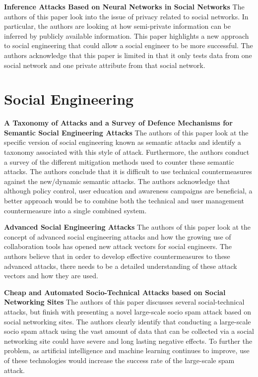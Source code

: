 \documentclass[conference]{IEEEtran}
\begin{document}
\textbf {Inference Attacks Based on Neural Networks in Social Networks}
The authors of this paper look into the issue of privacy related to social networks. In particular, the authors are looking at how semi-private information can be inferred by publicly available information.  This paper highlights a new approach to social engineering that could allow a social engineer to be more successful. The authors acknowledge that this paper is limited in that it only tests data from one social network and one private attribute from that social network. 

\section{Social Engineering}

\textbf {A Taxonomy of Attacks and a Survey of Defence Mechanisms for Semantic Social Engineering Attacks}
The authors of this paper look at the specific version of social engineering known as semantic attacks and identify a taxonomy associated with this style of attack. Furthermore, the authors conduct a survey of the different mitigation methods used to counter these semantic attacks.  The authors conclude that it is difficult to use technical countermeasures against the new/dynamic semantic attacks. The authors acknowledge that although policy control, user education and awareness campaigns are beneficial, a better approach would be to combine both the technical and user management countermeasure into a single combined system. 

\textbf {Advanced Social Engineering Attacks}
The authors of this paper look at the concept of advanced social engineering attacks and how the growing use of collaboration tools has opened new attack vectors for social engineers. The authors believe that in order to develop effective countermeasures to these advanced attacks, there needs to be a detailed understanding of these attack vectors and how they are used. 

\textbf {Cheap and Automated Socio-Technical Attacks based on Social Networking Sites}
The authors of this paper discusses several social-technical attacks, but finish with presenting a novel large-scale socio spam attack based on social networking sites. The authors clearly identify that conducting a large-scale socio spam attack using the vast amount of data that can be collected via a social networking site could have severe and long lasting negative effects. To further the problem, as artificial intelligence and machine learning continues to improve, use of these technologies would increase the success rate of the large-scale spam attack. 
\end{document}
